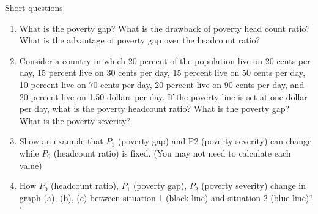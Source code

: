 \begin{homeworkProblem}{Short questions}

    \begin{enumerate}
        \item What is the poverty gap? What is the drawback of poverty head 
        count ratio? What is the advantage of poverty gap over the headcount 
        ratio?
        \item Consider a country in which 20 percent of the population live on 
        20 cents per day, 15 percent live on 30 cents per day, 15 percent live 
        on 50 cents per day, 10 percent live on 70 cents per day, 20 percent 
        live on 90 cents per day, and 20 percent live on 1.50 dollars per day. 
        If the poverty line is set at one dollar per day, what is the poverty 
        headcount ratio? What is the poverty gap? What is the poverty severity?
        \item Show an example that $P_1$ (poverty gap) and P2 (poverty 
        severity) can change while $P_0$ (headcount ratio) is fixed. (You may 
        not need to calculate each value)
        \item How $P_0$ (headcount ratio), $P_1$ (poverty gap), $P_2$ (poverty 
        severity) change in graph (a), (b), (c) between situation 1 (black 
        line) and situation 2 (blue line)?
'    \end{enumerate}

    \begin{solution}
    

\end{solution}
\end{homeworkProblem}
